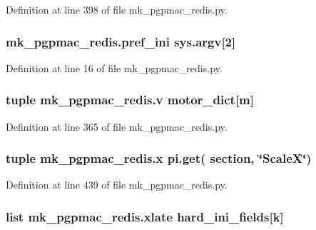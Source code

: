 Definition at line 398 of file mk\-\_\-pgpmac\-\_\-redis.\-py.

\hypertarget{namespacemk__pgpmac__redis_a38c785af5201403976e1267c47ea5096}{
\subsubsection[{pref\-\_\-ini}]{\setlength{\rightskip}{0pt plus 5cm}mk\-\_\-pgpmac\-\_\-redis.\-pref\-\_\-ini sys.\-argv\mbox{[}2\mbox{]}}}\label{namespacemk__pgpmac__redis_a38c785af5201403976e1267c47ea5096}


Definition at line 16 of file mk\-\_\-pgpmac\-\_\-redis.\-py.

\hypertarget{namespacemk__pgpmac__redis_ac732d49b0afca9a9951e3a252bae42fc}{
\subsubsection[{v}]{\setlength{\rightskip}{0pt plus 5cm}tuple mk\-\_\-pgpmac\-\_\-redis.\-v {\bf motor\-\_\-dict}\mbox{[}m\mbox{]}}}\label{namespacemk__pgpmac__redis_ac732d49b0afca9a9951e3a252bae42fc}


Definition at line 365 of file mk\-\_\-pgpmac\-\_\-redis.\-py.

\hypertarget{namespacemk__pgpmac__redis_abc8696f6f2f3fd3edd30989d3c8ec301}{
\subsubsection[{x}]{\setlength{\rightskip}{0pt plus 5cm}tuple mk\-\_\-pgpmac\-\_\-redis.\-x pi.\-get( section, \char`\"{}Scale\-X\char`\"{})}}\label{namespacemk__pgpmac__redis_abc8696f6f2f3fd3edd30989d3c8ec301}


Definition at line 439 of file mk\-\_\-pgpmac\-\_\-redis.\-py.

\hypertarget{namespacemk__pgpmac__redis_afba647feb8fc4d0a364c3dca29af3a22}{
\subsubsection[{xlate}]{\setlength{\rightskip}{0pt plus 5cm}list mk\-\_\-pgpmac\-\_\-redis.\-xlate {\bf hard\-\_\-ini\-\_\-fields}\mbox{[}k\mbox{]}}}\label{namespacemk__pgpmac__redis_afba647feb8fc4d0a364c3dca29af3a22}


